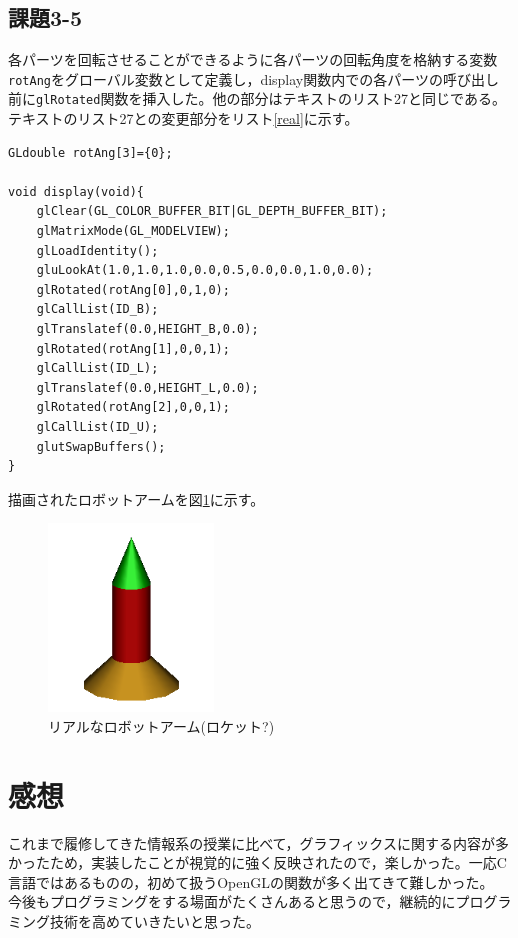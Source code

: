 \documentclass[]{jsarticle}
\begin{document}
\subsection{課題3-5}
各パーツを回転させることができるように各パーツの回転角度を格納する変数\texttt{rotAng}をグローバル変数として定義し，display関数内での各パーツの呼び出し前に\texttt{glRotated}関数を挿入した。他の部分はテキストのリスト27と同じである。テキストのリスト27との変更部分をリスト\ref{real}に示す。
\begin{lstlisting}[caption=リアルなロボットアームを描画するプログラム(変更部分),label=real]
GLdouble rotAng[3]={0};

void display(void){
	glClear(GL_COLOR_BUFFER_BIT|GL_DEPTH_BUFFER_BIT);
	glMatrixMode(GL_MODELVIEW);
	glLoadIdentity();
	gluLookAt(1.0,1.0,1.0,0.0,0.5,0.0,0.0,1.0,0.0);
	glRotated(rotAng[0],0,1,0);
	glCallList(ID_B);
	glTranslatef(0.0,HEIGHT_B,0.0);
	glRotated(rotAng[1],0,0,1);
	glCallList(ID_L);
	glTranslatef(0.0,HEIGHT_L,0.0);
	glRotated(rotAng[2],0,0,1);
	glCallList(ID_U);
	glutSwapBuffers();
}
\end{lstlisting}

描画されたロボットアームを図\ref{fig:3Drobotarm}に示す。
\begin{figure}
\begin{center}
\includegraphics[height=5cm,keepaspectratio]{real.png}
    \caption{リアルなロボットアーム(ロケット?)}
    \label{fig:3Drobotarm}
\end{center}
\end{figure}
\section{感想}
これまで履修してきた情報系の授業に比べて，グラフィックスに関する内容が多かったため，実装したことが視覚的に強く反映されたので，楽しかった。一応C言語ではあるものの，初めて扱うOpenGLの関数が多く出てきて難しかった。
今後もプログラミングをする場面がたくさんあると思うので，継続的にプログラミング技術を高めていきたいと思った。
\end{document}
